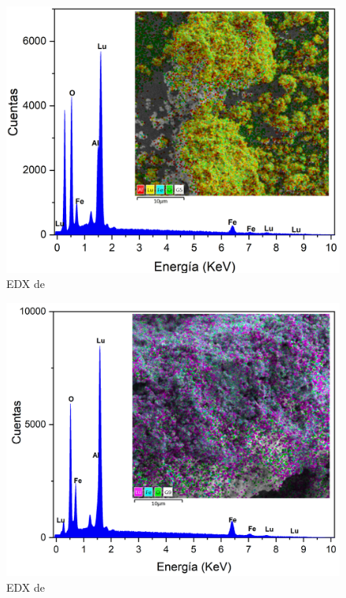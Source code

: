\begin{appendix}
	\begin{figure}[h]
		\centering%

		\includegraphics[width=\textwidth]{Anexos/EDXG5.png}%
		\caption{EDX de }\label{fig:edxg5}
	\end{figure}

	\begin{figure}[h]
		\centering%

		\includegraphics[width=\textwidth]{Anexos/EDXG9.png}%
		\caption{EDX de }\label{fig:edxg9}
	\end{figure}


\end{appendix}